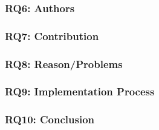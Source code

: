 \subsubsection{RQ6: Authors}
\subsubsection{RQ7: Contribution}
\subsubsection{RQ8: Reason/Problems}
\subsubsection{RQ9: Implementation Process}
\subsubsection{RQ10: Conclusion}

